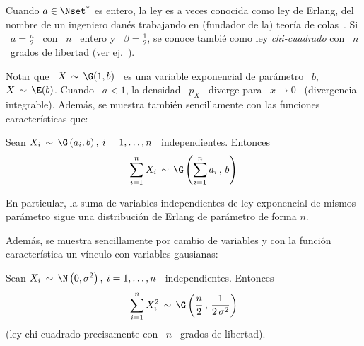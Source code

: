 Cuando $a \in \Nset^*$ es entero, la ley es a veces conocida como ley de Erlang,
del nombre  de un ingeniero dan\'es  trabajando en (fundador de  la) teor\'ia de
colas~\cite{Cox62, Erl09, Erl25, BroHal48}.  Si \  $a = \frac{n}{2}$ \ con \ $n$
\ entero y  \ $\beta = \frac12$, se conoce tambi\'e  como ley {\em chi-cuadrado}
con \ $n$ \ grados de libertad (ver ej.~\cite{JohKot95:v1}).

Notar que \ $X \, \sim \,  \G(1,b)$ \ es una variable exponencial de par\'ametro
\ $b$,  \ie \ $X  \, \sim \,  \E(b)$. Cuando \  $a < 1$,  la densidad \  $p_X$ \
diverge  para \  $x  \to 0$  \  (divergencia integrable).  Adem\'as, se  muestra
tambi\'en sencillamente con las funciones caracter\'isticas que:
%
\begin{lema}[Stabilidad]
\label{Lem:MP:StabilidadGamma}
%
  Sean $X_i  \, \sim  \, \G\left( a_i  , b  \right), \: i  = 1 ,  \ldots ,  n$ \
  independientes. Entonces
  \[
  \sum_{i=1}^n X_i \, \sim \, \G\left( \sum_{i=1}^n a_i \, , \, b \right)
  \]
\end{lema}
%
En particular, la suma de  variables independientes de ley exponencial de mismos
par\'ametro sigue una distribuci\'on de Erlang de par\'ametro de forma $n$.

Adem\'as, se  muestra sencillamente por cambio  de variables y  con la funci\'on
caracter\'istica un v\'inculo con variables gausianas:
%
\begin{lema}
\label{Lem:MP:VinculoGammaGaussiana}
%
  Sean $X_i \, \sim \,  \N\left( 0 , \sigma^2 \right), \: i = 1  , \ldots , n$ \
  independientes. Entonces
  \[
  \sum_{i=1}^n  X_i^2 \,  \sim \,  \G\left( \frac{n}{2}  \, ,  \,  \frac{1}{2 \,
      \sigma^2} \right)
  \]
  (ley chi-cuadrado precisamente con \ $n$ \ grados de libertad).
\end{lema}

